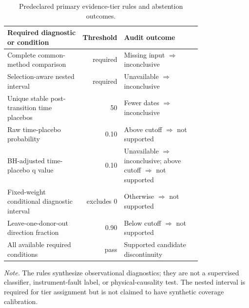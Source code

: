 \begin{table}[tbp]
\centering
\caption{Predeclared primary evidence-tier rules and abstention outcomes.}
\label{tab:evidence-tier-rules}
\scriptsize
\begin{tabular}{p{0.39\linewidth}rp{0.40\linewidth}}
\toprule
Required diagnostic or condition & Threshold & Audit outcome \\
\midrule
Complete common-method comparison & required & Missing input $\Rightarrow$ inconclusive \\
Selection-aware nested interval & required & Unavailable $\Rightarrow$ inconclusive \\
Unique stable post-transition time placebos & 50 & Fewer dates $\Rightarrow$ inconclusive \\
Raw time-placebo probability & 0.10 & Above cutoff $\Rightarrow$ not supported \\
BH-adjusted time-placebo q value & 0.10 & Unavailable $\Rightarrow$ inconclusive; above cutoff $\Rightarrow$ not supported \\
Fixed-weight conditional diagnostic interval & excludes 0 & Otherwise $\Rightarrow$ not supported \\
Leave-one-donor-out direction fraction & 0.90 & Below cutoff $\Rightarrow$ not supported \\
All available required conditions & pass & Supported candidate discontinuity \\
\bottomrule
\end{tabular}
\par\smallskip
\begin{minipage}{0.94\linewidth}
\footnotesize\textit{Note.} The rules synthesize observational diagnostics; they are not a supervised classifier, instrument-fault label, or physical-causality test. The nested interval is required for tier assignment but is not claimed to have synthetic coverage calibration.
\end{minipage}
\end{table}
